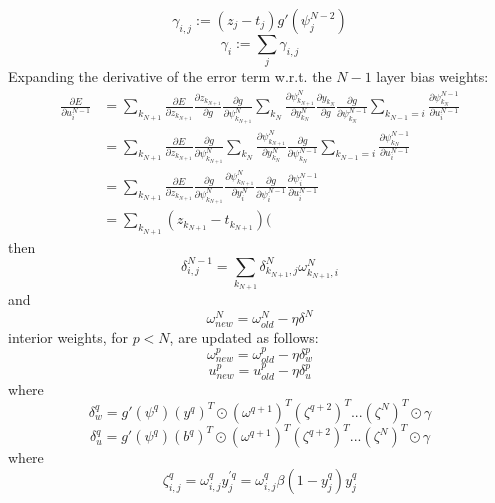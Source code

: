 \documentclass{article}
\begin{document}
%
\begin{equation} \label{eq:gamma}
\gamma_{i,j} := (z_j - t_j) g'(\psi_j^{N-2})
\end{equation}
%
\begin{equation} \label{eq:gamma_array}
\gamma_i := \sum_j \gamma_{i,j}
\end{equation}
%
Expanding the derivative of the error term w.r.t. the $N-1$ layer bias weights:
%
\begin{equation} \label{eq:derive_du_nm1}
\begin{aligned}
\frac{\partial E}{\partial u_i^{N-1}} &= 
\sum_{k_{N+1}} \frac{\partial E}{\partial z_{k_{N+1}}} \frac{\partial z_{k_{N+1}}}{\partial g} \frac{\partial g}{\partial \psi_{k_{N+1}}^N} \sum_{k_N} \frac{\partial \psi_{k_{N+1}}^N}{\partial y_{k_N}^N} \frac{\partial y_{k_{N}}}{\partial g} \frac{\partial g}{\partial \psi_{k_N}^{N-1}} \sum_{k_{N-1}=i} \frac{\partial \psi_{k_N}^{N-1}}{\partial u_i^{N-1}} \\
& = \sum_{k_{N+1}} \frac{\partial E}{\partial z_{k_{N+1}}} \frac{\partial g}{\partial \psi_{k_{N+1}}^N} \sum_{k_N} \frac{\partial \psi_{k_{N+1}}^N}{\partial y_{k_N}^N} \frac{\partial g}{\partial \psi_{k_N}^{N-1}} \sum_{k_{N-1}=i} \frac{\partial \psi_{k_N}^{N-1}}{\partial u_i^{N-1}} \\
& = \sum_{k_{N+1}} \frac{\partial E}{\partial z_{k_{N+1}}} \frac{\partial g}{\partial \psi_{k_{N+1}}^N} \frac{\partial \psi_{k_{N+1}}^N}{\partial y_i^N} \frac{\partial g}{\partial \psi_i^{N-1}} \frac{\partial \psi_i^{N-1}}{\partial u_i^{N-1}} \\
& = \sum_{k_{N+1}} (z_{k_{N+1}} - t_{k_{N+1}}) (
\end{aligned}
\end{equation}
%
then
%
\begin{equation} \label{eq:delta2}
\delta_{i,j}^{N-1} =
\sum_{k_{N+1}} \delta_{k_{N+1},j}^N \omega_{k_{N+1},i}^N
\end{equation}
%
and
%
\begin{equation} \label{eq:end_weights}
\omega_{new}^N = \omega_{old}^N - \eta \delta^N
\end{equation}
%
interior weights, for $p < N$, are updated as follows:
%
\begin{equation} \label{eq:w_weights}
\omega_{new}^p = \omega_{old}^p - \eta \delta_w^p
\end{equation}
%
\begin{equation} \label{eq:u_weights}
u_{new}^p = u_{old}^p - \eta \delta_u^p
\end{equation}
%
where
%
\begin{equation} \label{eq:w_delta}
\delta_w^{q} = g'(\psi^{q}) (y^{q})^T \odot (\omega^{q+1})^T (\zeta^{q+2})^T ... (\zeta^N)^T \odot \gamma
\end{equation}
%
\begin{equation} \label{eq:u_delta}
\delta_u^{q} = g'(\psi^{q}) (b^{q})^T \odot (\omega^{q+1})^T (\zeta^{q+2})^T ... (\zeta^N)^T \odot \gamma
\end{equation}
%
where
%
\begin{equation} \label{eq:u_delta}
\zeta_{i,j}^q = \omega_{i,j}^q y_j^{\prime q} = \omega_{i,j}^q \beta (1 - y_j^q) y_j^q
\end{equation}
%
\end{document}
